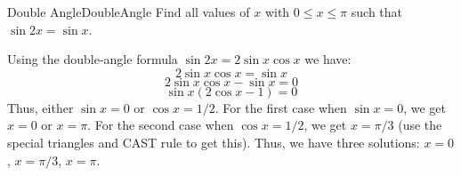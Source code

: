 \begin{example}{Double Angle}{DoubleAngle}
Find all values of $x$ with $0\leq x\leq \pi$ such that $\sin 2x=\sin x$.
\end{example}

\begin{solution} 
Using the double-angle formula $\sin 2x = 2\sin x\cos x$ we have:
$$2\sin x\cos x = \sin x$$
$$2\sin x\cos x- \sin x = 0$$
$$\sin x(2\cos x - 1)=0$$
Thus, either $\sin x=0$ or $\cos x = 1/2$.
For the first case when $\sin x = 0$, we get $x=0$ or $x=\pi$.
For the second case when $\cos x=1/2$, we get $x=\pi/3$ (use the special triangles and CAST rule to get this).
Thus, we have three solutions: $x=0$, $x=\pi/3$, $x=\pi$.
\end{solution}